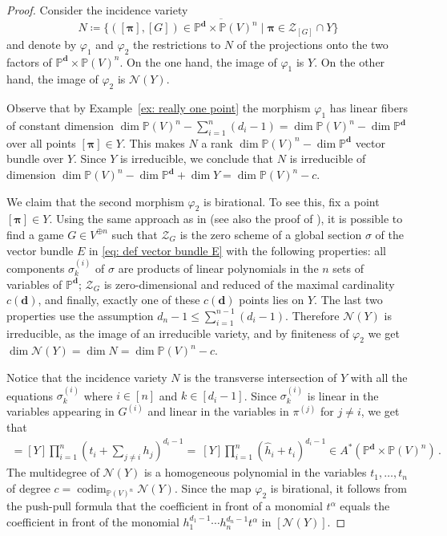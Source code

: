 \documentclass[12pt]{article}
\theoremstyle{definition}
\newcommand{\PP}{{\mathbb P}}
\def\bd{{\boldsymbol{d}}}
\def\bpi{{\boldsymbol{\pi}}}
\def\codim{\operatorname{codim}}
\newcommand{\kn}{{\mathcal N}}
\newcommand{\kz}{{\mathcal Z}}
\begin{document}
\begin{proof}
Consider the incidence variety
\begin{equation}\label{eq: incidence variety}
    N \coloneqq \overline{\{([\bpi],[G])\in\PP^\bd\times \PP(V)^n\mid \bpi\in \kz_{[G]}\cap Y\}}
\end{equation}
and denote by $\varphi_1$ and $\varphi_2$ the restrictions to $N$ of the projections onto the two factors of $\PP^\bd\times\PP(V)^n$. On the one hand, the image of $\varphi_1$ is $Y$. On the other hand, the image of $\varphi_2$ is $\kn(Y)$.

Observe that by Example~\ref{ex: really one point} the morphism $\varphi_1$ has linear fibers of constant dimension $\dim\PP(V)^n-\sum_{i=1}^n(d_i-1)=\dim\PP(V)^n-\dim \PP^\bd$ over all points $[\bpi]\in Y$. This makes $N$ a rank $\dim\PP(V)^n-\dim \PP^\bd$ vector bundle over $Y$. Since $Y$ is irreducible, we conclude that $N$ is irreducible of dimension $\dim\PP(V)^n-\dim \PP^\bd +\dim Y=\dim\PP (V)^n-c$. 

We claim that the second morphism $\varphi_2$ is birational. To see this, fix a point $[\bpi]\in Y$. Using the same approach as in \cite[Theorem 4.1]{mckelvey1997maximal} (see also the proof of \cite[Lemma 3.5]{abo2026vector}), it is possible to find a game $G\in V^{\oplus n}$ such that $\kz_G$ is the zero scheme of a global section $\sigma$ of the vector bundle $E$ in \eqref{eq: def vector bundle E} with the following properties: all components $\sigma_k^{(i)}$ of $\sigma$ are products of linear polynomials in the $n$ sets of variables of $\PP^\bd$; $\kz_G$ is zero-dimensional and reduced of the maximal cardinality $c(\bd)$, and finally, exactly one of these $c(\bd)$ points lies on $Y$. The last two properties use the assumption $d_n-1\le\sum_{i=1}^{n-1}(d_i-1)$. 
Therefore $\kn(Y)$ is irreducible, as the image of an irreducible variety, and by finiteness of $\varphi_2$ we get $\dim \kn(Y)=\dim N=\dim \PP(V)^n-c$. 

Notice that the incidence variety $N$ is the transverse intersection of $Y$ with all the equations $\sigma_k^{(i)}$ where $i\in[n]$ and $k\in[d_i-1]$. Since $\sigma_k^{(i)}$ is linear in the variables appearing in $G^{(i)}$ and linear in the variables in $\pi^{(j)}$ for $j\neq i$, we get that
\begin{align*}
    [N]=[Y]\prod_{i=1}^n\left(t_i+\sum_{j\neq i}h_j\right)^{d_i-1} =\ [Y]\prod_{i=1}^n(\widehat{h}_i+t_i)^{d_i-1}\in A^*(\PP^\bd \times \PP(V)^n)\,.
\end{align*}
The multidegree of $\kn(Y)$ is a homogeneous polynomial in the variables $t_1,\ldots,t_n$ of degree $c=\codim_{\PP(V)^n}\kn(Y)$. Since the map $\varphi_2$ is birational, it follows from the push-pull formula that the coefficient in front of a monomial $t^\alpha$ equals the coefficient in front of the monomial $h_1^{d_1-1}\cdots h_n^{d_n-1}t^\alpha$ in $[\kn(Y)]$. 
\end{proof}
\end{document}
